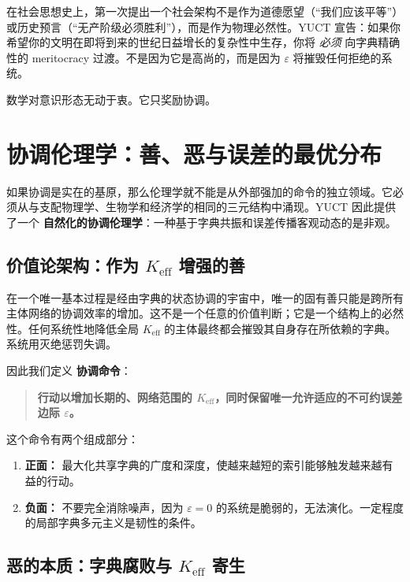 \documentclass[12pt,a4paper]{article}
\begin{document}
	在社会思想史上，第一次提出一个社会架构不是作为道德愿望（“我们应该平等”）或历史预言（“无产阶级必须胜利”），而是作为物理必然性。YUCT 宣告：如果你希望你的文明在即将到来的世纪日益增长的复杂性中生存，你将 \emph{必须} 向字典精确性的 meritocracy 过渡。不是因为它是高尚的，而是因为 \(\varepsilon\) 将摧毁任何拒绝的系统。
	
	数学对意识形态无动于衷。它只奖励协调。
	
	\section{协调伦理学：善、恶与误差的最优分布}
	\label{sec:coordination-ethics}
	
	如果协调是实在的基原，那么伦理学就不能是从外部强加的命令的独立领域。它必须从与支配物理学、生物学和经济学的相同的三元结构中涌现。YUCT 因此提供了一个 \textbf{自然化的协调伦理学}：一种基于字典共振和误差传播客观动态的是非观。
	
	\subsection{价值论架构：作为 \(K_{\mathrm{eff}}\) 增强的善}
	
	在一个唯一基本过程是经由字典的状态协调的宇宙中，唯一的固有善只能是跨所有主体网络的协调效率的增加。这不是一个任意的价值判断；它是一个结构上的必然性。任何系统性地降低全局 \(K_{\mathrm{eff}}\) 的主体最终都会摧毁其自身存在所依赖的字典。系统用灭绝惩罚失调。
	
	因此我们定义 \textbf{协调命令}：
	
	\begin{quote}
		\textbf{行动以增加长期的、网络范围的 $K_{\mathrm{eff}}$，同时保留唯一允许适应的不可约误差边际 $\varepsilon$。}
	\end{quote}
	
	这个命令有两个组成部分：
	\begin{enumerate}[leftmargin=*]
		\item \textbf{正面：} 最大化共享字典的广度和深度，使越来越短的索引能够触发越来越有益的行动。
		\item \textbf{负面：} 不要完全消除噪声，因为 \(\varepsilon = 0\) 的系统是脆弱的，无法演化。一定程度的局部字典多元主义是韧性的条件。
	\end{enumerate}
	
	\subsection{恶的本质：字典腐败与 \(K_{\mathrm{eff}}\) 寄生}
	
\end{document}
